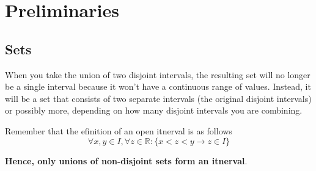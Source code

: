 \section{Preliminaries}

\subsection{Sets}

When you take the union of two disjoint intervals, the resulting set will no longer be
a single interval because it won't have a continuous range of values. Instead, it will be
a set that consists of two separate intervals (the original disjoint intervals) or
possibly more, depending on how many disjoint intervals you are combining.

Remember that the efinition of an open itnerval is as follows
$$
\forall x,y\in I, \forall z\in\mathbb{R} : \{ x < z < y \rightarrow z\in I\}
$$

\textbf{Hence, only unions of non-disjoint sets form an itnerval}.